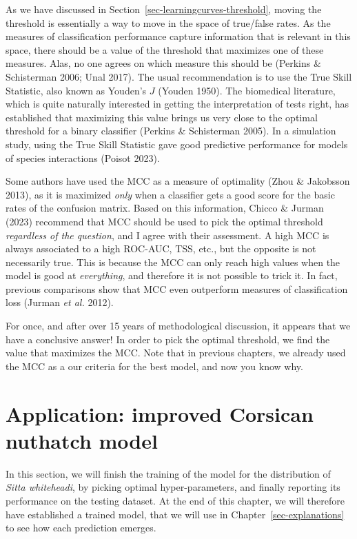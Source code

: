 \documentclass[
  letterpaper,
]{scrbook}
\begin{document}
As we have discussed in Section~\ref{sec-learningcurves-threshold},
moving the threshold is essentially a way to move in the space of
true/false rates. As the measures of classification performance capture
information that is relevant in this space, there should be a value of
the threshold that maximizes one of these measures. Alas, no one agrees
on which measure this should be (Perkins \& Schisterman 2006; Unal
2017). The usual recommendation is to use the True Skill Statistic, also
known as Youden's \(J\) (Youden 1950). The biomedical literature, which
is quite naturally interested in getting the interpretation of tests
right, has established that maximizing this value brings us very close
to the optimal threshold for a binary classifier (Perkins \& Schisterman
2005). In a simulation study, using the True Skill Statistic gave good
predictive performance for models of species interactions (Poisot 2023).

Some authors have used the MCC as a measure of optimality (Zhou \&
Jakobsson 2013), as it is maximized \emph{only} when a classifier gets a
good score for the basic rates of the confusion matrix. Based on this
information, Chicco \& Jurman (2023) recommend that MCC should be used
to pick the optimal threshold \emph{regardless of the question}, and I
agree with their assessment. A high MCC is always associated to a high
ROC-AUC, TSS, etc., but the opposite is not necessarily true. This is
because the MCC can only reach high values when the model is good at
\emph{everything}, and therefore it is not possible to trick it. In
fact, previous comparisons show that MCC even outperform measures of
classification loss (Jurman \emph{et al.} 2012).

For once, and after over 15 years of methodological discussion, it
appears that we have a conclusive answer! In order to pick the optimal
threshold, we find the value that maximizes the MCC. Note that in
previous chapters, we already used the MCC as a our criteria for the
best model, and now you know why.

\section{Application: improved Corsican nuthatch
model}\label{application-improved-corsican-nuthatch-model}

In this section, we will finish the training of the model for the
distribution of \emph{Sitta whiteheadi}, by picking optimal
hyper-parameters, and finally reporting its performance on the testing
dataset. At the end of this chapter, we will therefore have established
a trained model, that we will use in Chapter~\ref{sec-explanations} to
see how each prediction emerges.
\end{document}
